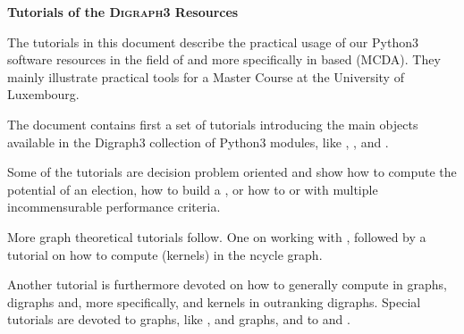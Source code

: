 \documentclass[a4paper,12pt,english]{sphinxhowto}
\begin{document}
    \clearpage

    
\pagestyle{plain}
\sphinxtableofcontents
\pagestyle{normal}
\label{\detokenize{tutorial::doc}}
\begingroup
{}


\label{\detokenize{tutorial:tutorial-label}}
\textbf{\Large{Tutorials of the \textsc{Digraph3} Resources}}
\vspace{5mm}

The tutorials in this document describe the practical usage of our  Python3 software resources in the field of  and more specifically in  based  (MCDA). They mainly illustrate practical tools for a Master Course  at the University of Luxembourg.

The document contains first a set of tutorials introducing the main objects available in the Digraph3 collection of Python3 modules, like , ,  and .

Some of the tutorials are decision problem oriented and show how to compute the potential  of an election, how to build a , or how to  or  with multiple incommensurable performance criteria.

More graph theoretical tutorials follow. One on working with , followed by a tutorial on how to compute  (kernels) in the n\sphinxhyphen{}cycle graph.

Another tutorial is furthermore devoted on how to generally compute  in graphs, digraphs and, more specifically,  and  kernels in outranking digraphs. Special tutorials are devoted to  graphs, like ,  and  graphs, and to  and .
\end{document}
